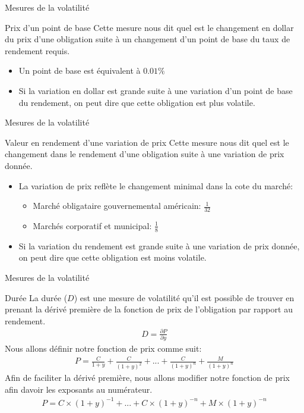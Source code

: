 \documentclass{beamer}
\begin{document}
\begin{frame}{Mesures de la volatilité}
\begin{block}{Prix d’un point de base}
Cette mesure nous dit quel est le changement en dollar du prix d'une obligation suite à un changement d'un point de base du taux de rendement requis.
\begin{itemize}
\item Un point de base est équivalent à $0.01\%$
\item Si la variation en dollar est grande suite à une variation d'un point de base du rendement, on peut dire que cette obligation est plus volatile.
\end{itemize}
\end{block}
\end{frame}


\begin{frame}{Mesures de la volatilité}
\begin{block}{Valeur en rendement d’une variation de prix}
Cette mesure nous dit quel est le changement dans le rendement d'une obligation suite à une variation de prix donnée.  
\begin{itemize}
\item La variation de prix reflète le changement minimal dans la cote du marché: 
\begin{itemize}
\item Marché obligataire gouvernemental américain: $\frac{1}{32}$
\item Marchés corporatif et municipal: $\frac{1}{8}$
\end{itemize}
\item Si la variation du rendement est grande suite à une variation de prix donnée, on peut dire que cette obligation est moins volatile.
\end{itemize}
\end{block}
\end{frame}




\begin{frame}{Mesures de la volatilité}
\begin{block}{Durée}
La durée ($D$) est une mesure de volatilité qu'il est possible de trouver en prenant la dérivé première de  la fonction de prix de l'obligation par rapport au rendement. 
\begin{align*}
D=\frac{\partial P}{\partial y}
\end{align*}
Nous allons définir notre fonction de prix comme suit:
\begin{align*}
P=\frac{C}{1+y}+\frac{C}{(1+y)^2}+...+\frac{C}{(1+y)^n}+\frac{M}{(1+y)^n}
\end{align*}
Afin de faciliter la dérivé première, nous allons modifier notre fonction de prix afin davoir les exposants au numérateur.
\begin{align*}
P=C \times (1+y)^{-1}+...+C \times (1+y)^{-n}+M \times (1+y)^{-n}
\end{align*}
\end{block}
\end{frame}
\end{document}
